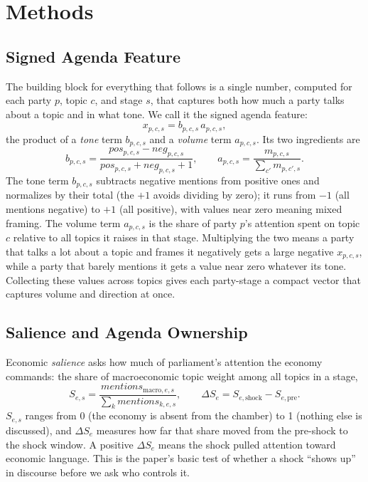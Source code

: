 \documentclass[11pt]{article}
\begin{document}
\section{Methods}
\subsection{Signed Agenda Feature}
The building block for everything that follows is a single number, computed for each party $p$, topic $c$, and stage $s$, that captures both how much a party talks about a topic and in what tone. We call it the signed agenda feature:
\begin{equation}
x_{p,c,s} = b_{p,c,s}\, a_{p,c,s},
\end{equation}
the product of a \emph{tone} term $b_{p,c,s}$ and a \emph{volume} term $a_{p,c,s}$. Its two ingredients are
\begin{equation}
b_{p,c,s} =
\frac{pos_{p,c,s}-neg_{p,c,s}}{pos_{p,c,s}+neg_{p,c,s}+1},
\qquad
a_{p,c,s} =
\frac{m_{p,c,s}}{\sum_{c'} m_{p,c',s}}.
\end{equation}
The tone term $b_{p,c,s}$ subtracts negative mentions from positive ones and normalizes by their total (the $+1$ avoids dividing by zero); it runs from $-1$ (all mentions negative) to $+1$ (all positive), with values near zero meaning mixed framing. The volume term $a_{p,c,s}$ is the share of party $p$'s attention spent on topic $c$ relative to all topics it raises in that stage. Multiplying the two means a party that talks a lot about a topic and frames it negatively gets a large negative $x_{p,c,s}$, while a party that barely mentions it gets a value near zero whatever its tone. Collecting these values across topics gives each party-stage a compact vector that captures volume and direction at once.

\subsection{Salience and Agenda Ownership}
Economic \emph{salience} asks how much of parliament's attention the economy commands: the share of macroeconomic topic weight among all topics in a stage,
\begin{equation}
S_{e,s} = \frac{mentions_{\text{macro},e,s}}{\sum_k mentions_{k,e,s}},
\qquad
\Delta S_e = S_{e,\text{shock}} - S_{e,\text{pre}}.
\end{equation}
$S_{e,s}$ ranges from 0 (the economy is absent from the chamber) to 1 (nothing else is discussed), and $\Delta S_e$ measures how far that share moved from the pre-shock to the shock window. A positive $\Delta S_e$ means the shock pulled attention toward economic language. This is the paper's basic test of whether a shock ``shows up'' in discourse before we ask who controls it.
\end{document}

